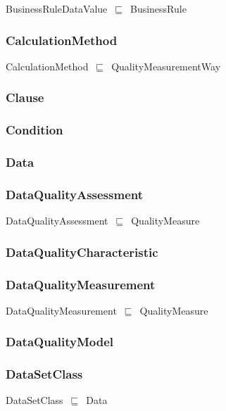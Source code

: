 \documentclass{article}
\begin{document}
BusinessRuleDataValue~\ensuremath{\sqsubseteq}~BusinessRule~

\subsubsection*{CalculationMethod}

CalculationMethod~\ensuremath{\sqsubseteq}~QualityMeasurementWay~

\subsubsection*{Clause}

\subsubsection*{Condition}

\subsubsection*{Data}

\subsubsection*{DataQualityAssessment}

DataQualityAssessment~\ensuremath{\sqsubseteq}~QualityMeasure~

\subsubsection*{DataQualityCharacteristic}

\subsubsection*{DataQualityMeasurement}

DataQualityMeasurement~\ensuremath{\sqsubseteq}~QualityMeasure~

\subsubsection*{DataQualityModel}

\subsubsection*{DataSetClass}

DataSetClass~\ensuremath{\sqsubseteq}~Data~
\end{document}
